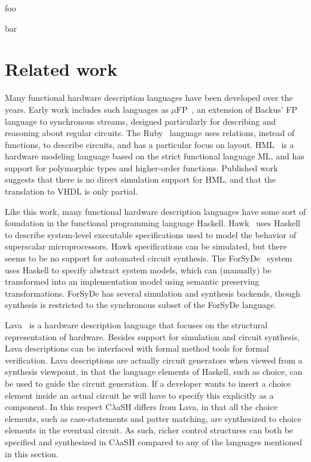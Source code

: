 \documentclass[conference]{IEEEtran}
\begin{document}
foo\par bar

\section{Related work}
Many functional hardware description languages have been developed over the years. Early work includes such languages as $\mu$FP~\cite{muFP}, an extension of Backus' FP language to synchronous streams, designed particularly for describing and reasoning about regular circuits. The Ruby~\cite{Ruby} language uses relations, instead of functions, to describe circuits, and has a particular focus on layout. HML~\cite{HML2} is a hardware modeling language based on the strict functional language ML, and has support for polymorphic types and higher-order functions. Published work suggests that there is no direct simulation support for HML, and that the translation to VHDL is only partial.

Like this work, many functional hardware description languages have some sort of foundation in the functional programming language Haskell. Hawk~\cite{Hawk1} uses Haskell to describe system-level executable specifications used to model the behavior of superscalar microprocessors. Hawk specifications can be simulated, but there seems to be no support for automated circuit synthesis. The ForSyDe~\cite{ForSyDe2} system uses Haskell to specify abstract system models, which can (manually) be transformed into an implementation model using semantic preserving transformations. ForSyDe has several simulation and synthesis backends, though synthesis is restricted to the synchronous subset of the ForSyDe language.

Lava~\cite{Lava} is a hardware description language that focuses on the structural representation of hardware. Besides support for simulation and circuit synthesis, Lava descriptions can be interfaced with formal method tools for formal verification. Lava descriptions are actually circuit generators when viewed from a synthesis viewpoint, in that the language elements of Haskell, such as choice, can be used to guide the circuit generation. If a developer wants to insert a choice element inside an actual circuit he will have to specify this explicitly as a component. In this respect C$\lambda$aSH differs from Lava, in that all the choice elements, such as case-statements and patter matching, are synthesized to choice elements in the eventual circuit. As such, richer control structures can both be specified and synthesized in C$\lambda$aSH compared to any of the languages mentioned in this section.
\end{document}
